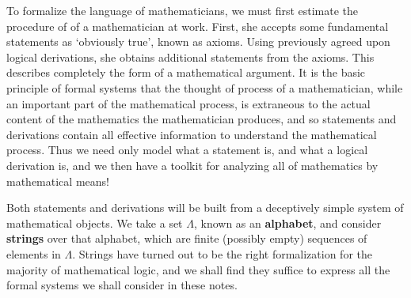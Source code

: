 To formalize the language of mathematicians, we must first estimate the procedure of of a mathematician at work. First, she accepts some fundamental statements as `obviously true', known as axioms. Using previously agreed upon logical derivations, she obtains additional statements from the axioms. This describes completely the form of a mathematical argument. It is the basic principle of formal systems that the thought of process of a mathematician, while an important part of the mathematical process, is extraneous to the actual content of the mathematics the mathematician produces, and so statements and derivations contain all effective information to understand the mathematical process. Thus we need only model what a statement is, and what a logical derivation is, and we then have a toolkit for analyzing all of mathematics by mathematical means!


Both statements and derivations will be built from a deceptively simple system of mathematical objects. We take a set $\Lambda$, known as an {\bf alphabet}, and consider {\bf strings} over that alphabet, which are finite (possibly empty) sequences of elements in $\Lambda$. Strings have turned out to be the right formalization for the majority of mathematical logic, and we shall find they suffice to express all the formal systems we shall consider in these notes.

